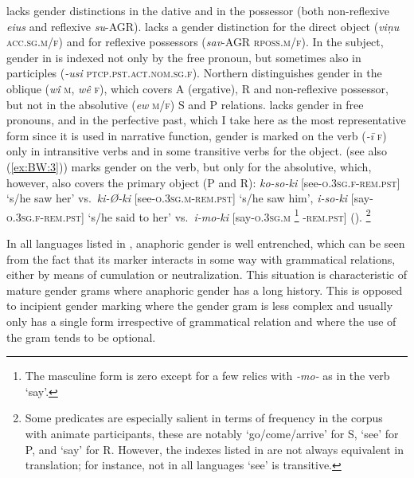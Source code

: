 \documentclass[output=collectionpaper]{langsci/langscibook}
\begin{document}
 lacks gender distinctions in the dative and in the possessor (both non-reflexive \textit{eius} and reflexive \textit{su}-AGR).  lacks a gender distinction for the direct object (\textit{viņu} \textsc{acc.sg.m/f}) and for reflexive possessors (\textit{sav}-AGR \textsc{rposs.m/f}). In the subject, gender in  is indexed not only by the free pronoun, but sometimes also in participles (\textit{-usi} \textsc{ptcp.pst.act.nom.sg.f}). Northern  distinguishes gender in the oblique (\textit{wî} \textsc{m}, \textit{wê} \textsc{f}), which covers A (ergative), R and non-reflexive possessor, but not in the absolutive (\textit{ew} \textsc{m/f}) S and P relations.  lacks gender in free pronouns, and in the perfective past, which I take here as the most representative form since it is used in narrative function, gender is marked on the verb (\textit{-ī} \textsc{f}) only in intransitive verbs and in some transitive verbs for the object.  (see also (\ref{ex:BW:3})) marks gender on the verb, but only for the absolutive, which, however, also covers the primary object (P and R): \textit{ko-so-ki} [see-\textsc{o.3sg.f-rem.pst}] ‘s/he saw her’ vs.\ \textit{ki-Ø-ki} [see-\textsc{o.3sg.m-rem.pst}] ‘s/he saw him’, \textit{i-so-ki} [say-\textsc{o.3sg.f-rem.pst}] ‘s/he said to her’ vs.\ \textit{i-mo-ki} [say-\textsc{o.3sg.m}%
\footnote{%
The masculine form is zero except for a few relics with \textit{-mo-} as in the verb ‘say’.
}%
\textsc{-rem.pst}] (\citealt{Arsjoe1999}).%
\footnote{%
Some predicates are especially salient in terms of frequency in the corpus with animate participants, these are notably ‘go/come/arrive’ for S, ‘see’ for P, and ‘say’ for R. However, the indexes listed in  are not always equivalent in translation; for instance, not in all languages ‘see’ is transitive.
}%

In all languages listed in , anaphoric gender is well entrenched, which can be seen from the fact that its marker interacts in some way with grammatical relations, either by means of cumulation or neutralization. This situation is characteristic of mature gender grams where anaphoric gender has a long history. This is opposed to incipient gender marking where the gender gram is less complex and usually only has a single form irrespective of grammatical relation and where the use of the gram tends to be optional.
\end{document}
